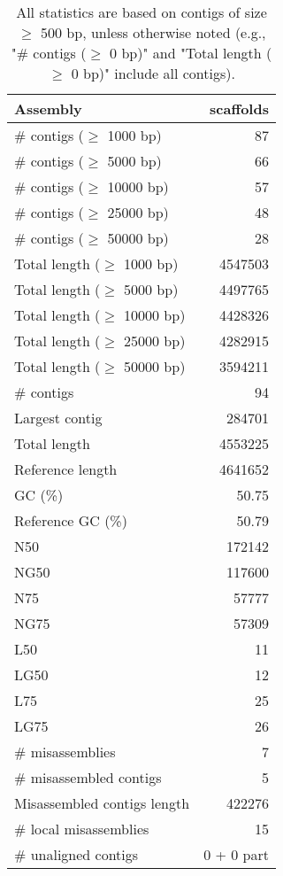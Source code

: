 \documentclass[12pt,a4paper]{article}
\begin{document}
\begin{table}[ht]
\begin{center}
\caption{All statistics are based on contigs of size $\geq$ 500 bp, unless otherwise noted (e.g., "\# contigs ($\geq$ 0 bp)" and "Total length ($\geq$ 0 bp)" include all contigs).}
\begin{tabular}{|l*{1}{|r}|}
\hline
Assembly & scaffolds \\ \hline
\# contigs ($\geq$ 1000 bp) & 87 \\ \hline
\# contigs ($\geq$ 5000 bp) & 66 \\ \hline
\# contigs ($\geq$ 10000 bp) & 57 \\ \hline
\# contigs ($\geq$ 25000 bp) & 48 \\ \hline
\# contigs ($\geq$ 50000 bp) & 28 \\ \hline
Total length ($\geq$ 1000 bp) & 4547503 \\ \hline
Total length ($\geq$ 5000 bp) & 4497765 \\ \hline
Total length ($\geq$ 10000 bp) & 4428326 \\ \hline
Total length ($\geq$ 25000 bp) & 4282915 \\ \hline
Total length ($\geq$ 50000 bp) & 3594211 \\ \hline
\# contigs & 94 \\ \hline
Largest contig & 284701 \\ \hline
Total length & 4553225 \\ \hline
Reference length & 4641652 \\ \hline
GC (\%) & 50.75 \\ \hline
Reference GC (\%) & 50.79 \\ \hline
N50 & 172142 \\ \hline
NG50 & 117600 \\ \hline
N75 & 57777 \\ \hline
NG75 & 57309 \\ \hline
L50 & 11 \\ \hline
LG50 & 12 \\ \hline
L75 & 25 \\ \hline
LG75 & 26 \\ \hline
\# misassemblies & 7 \\ \hline
\# misassembled contigs & 5 \\ \hline
Misassembled contigs length & 422276 \\ \hline
\# local misassemblies & 15 \\ \hline
\# unaligned contigs & 0 + 0 part \\ \hline

\end{tabular}
\end{center}
\end{table}
\end{document}
